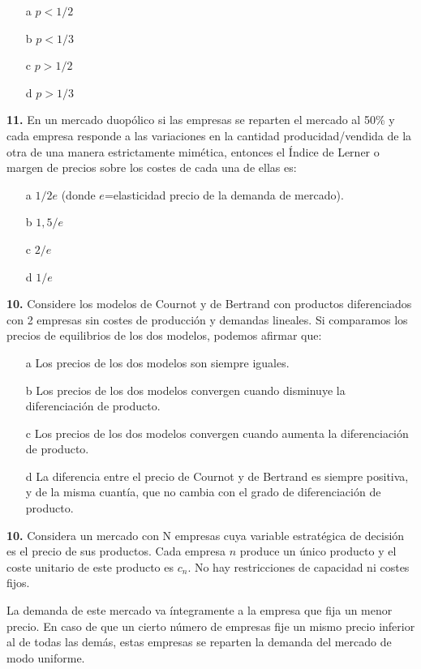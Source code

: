 \documentclass{nuevotema}
\begin{document}
\begin{enumerate}
	\item[a] $p < 1/2$
	\item[b] $p < 1/3$
	\item[c] $p > 1/2$
	\item[d] $p > 1/3$
\end{enumerate}

\textbf{11.} En un mercado duopólico si las empresas se reparten el mercado al 50\% y cada empresa responde a las variaciones en la cantidad producidad/vendida de la otra de una manera estrictamente mimética, entonces el Índice de Lerner o margen de precios sobre los costes de cada una de ellas es:
\begin{enumerate}
	\item[a] $1/2e$ (donde $e$=elasticidad precio de la demanda de mercado).
	\item[b] $1,5/e$
	\item[c] $2/e$
	\item[d] $1/e$
\end{enumerate}


\textbf{10.} Considere los modelos de Cournot y de Bertrand con productos diferenciados con 2 empresas sin costes de producción y demandas lineales. Si comparamos los precios de equilibrios de los dos modelos, podemos afirmar que:
\begin{enumerate}
	\item[a] Los precios de los dos modelos son siempre iguales.
	\item[b] Los precios de los dos modelos convergen cuando disminuye la diferenciación de producto. 
	\item[c] Los precios de los dos modelos convergen cuando aumenta la diferenciación de producto.
	\item[d] La diferencia entre el precio de Cournot y de Bertrand es siempre positiva, y de la misma cuantía, que no cambia con el grado de diferenciación de producto.
\end{enumerate}


\textbf{10.} Considera un mercado con N empresas cuya variable estratégica de decisión es el precio de sus productos. Cada empresa $n$ produce un único producto y el coste unitario de este producto es $c_n$. No hay restricciones de capacidad ni costes fijos.

La demanda de este mercado va íntegramente a la empresa que fija un menor precio. En caso de que un cierto número de empresas fije un mismo precio inferior al de todas las demás, estas empresas se reparten la demanda del mercado de modo uniforme.
\end{document}
